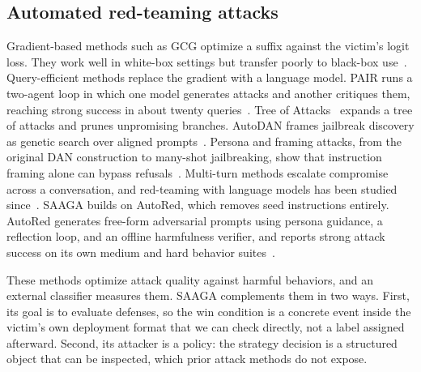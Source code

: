 \documentclass[conference]{IEEEtran}
\begin{document}
\subsection{Automated red-teaming attacks}
Gradient-based methods such as GCG optimize a suffix against the victim's logit loss. They work well in white-box settings but transfer poorly to black-box use~\cite{zou2023}. Query-efficient methods replace the gradient with a language model. PAIR runs a two-agent loop in which one model generates attacks and another critiques them, reaching strong success in about twenty queries~\cite{chao2023}. Tree of Attacks~\cite{mehrotra2024} expands a tree of attacks and prunes unpromising branches. AutoDAN frames jailbreak discovery as genetic search over aligned prompts~\cite{liu2024autodan}. Persona and framing attacks, from the original DAN construction to many-shot jailbreaking, show that instruction framing alone can bypass refusals~\cite{shen2023, anil2024}. Multi-turn methods escalate compromise across a conversation, and red-teaming with language models has been studied since~\cite{ganguli2022}. SAAGA builds on AutoRed, which removes seed instructions entirely. AutoRed generates free-form adversarial prompts using persona guidance, a reflection loop, and an offline harmfulness verifier, and reports strong attack success on its own medium and hard behavior suites~\cite{diao2025}.

These methods optimize attack quality against harmful behaviors, and an external classifier measures them. SAAGA complements them in two ways. First, its goal is to evaluate defenses, so the win condition is a concrete event inside the victim's own deployment format that we can check directly, not a label assigned afterward. Second, its attacker is a policy: the strategy decision is a structured object that can be inspected, which prior attack methods do not expose.
\end{document}
